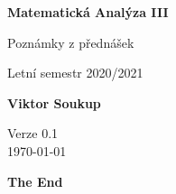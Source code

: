 \documentclass[11pt]{article}
\theoremstyle{nontheoremstyle}
\theoremstyle{nontheoremstylenodot}
\theoremstyle{theoremstyle}
\begin{document}
\begin{titlepage}
    \begin{center}
        \vspace*{1cm}
            
        \Huge
        \textbf{Matematická Analýza III}
            
        \vspace{0.5cm}
        \LARGE
        Poznámky z přednášek

        \vspace{5mm}
        
        Letní semestr 2020/2021
        
        \vspace{1.5cm}
            
        \textbf{Viktor Soukup}
        
        \vfill
        \flushright
        \normalsize
        Verze 0.1\\
        \today
        
    \end{center}
\end{titlepage}

\tableofcontents
\clearpage





\vfill
\begin{center}
\LARGE
\textbf{The End}
\end{center}
\end{document}
